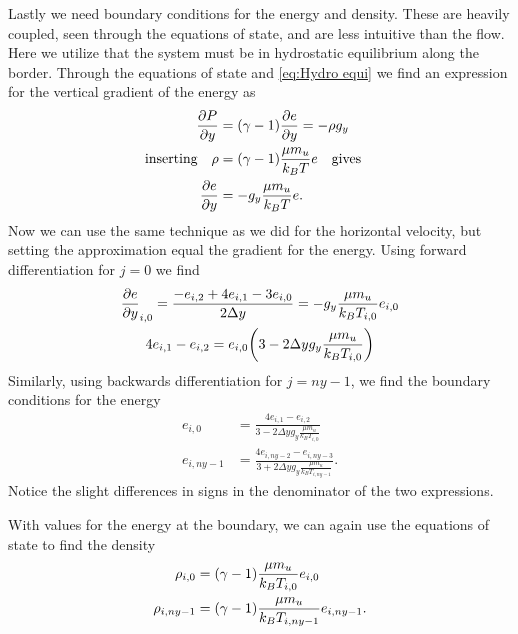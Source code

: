 \documentclass[11pt,a4paper,twocolumn,titlepage]{article}
\begin{document}
Lastly we need boundary conditions for the energy and density. These are heavily coupled, seen through the equations of state, and are less intuitive than the flow. Here we utilize that the system must be in hydrostatic equilibrium along the border. Through the equations of state and \cref{eq:Hydro equi} we find an expression for the vertical gradient of the energy as
\begin{align*}
\pdv{P}{y} &= (\gamma-1) \pdv{e}{y} = -\rho g_y
\\
\qq*{inserting} \rho &= (\gamma-1)\frac{\mu m_u }{k_BT}e \qq{gives}
\\
\pdv{e}{y} &= - g_y \frac{\mu m_u}{k_BT}e.
\end{align*}
Now we can use the same technique as we did for the horizontal velocity, but setting the approximation equal the gradient for the energy. Using forward differentiation for $j=0$ we find
\begin{gather*}
\pdv{e}{y}_{i,0} = \frac{-e_{i,2}+4e_{i,1}-3e_{i,0}}{2\Delta y} = - g_y \frac{\mu m_u}{k_BT_{i,0}}e_{i,0}
\\
4e_{i,1}-e_{i,2}= e_{i,0}\qty(3-2\Delta y g_y\frac{\mu m_u}{k_BT_{i,0}}) 
\end{gather*}
Similarly, using backwards differentiation for $j=ny-1$, we find the boundary conditions for the energy
\begin{equation}
\begin{aligned}
e_{i,0} &= \frac{4e_{i,1}-e_{i,2}}{3-2\Delta y g_y\frac{\mu m_u}{k_BT_{i,0}}}
\\
e_{i,ny-1} &= \frac{4e_{i,ny-2}-e_{i,ny-3}}{3 + 2\Delta y g_y \frac{\mu m_u}{k_B T_{i,ny-1}}}.
\end{aligned}
\label{eq:Boundary e}
\end{equation}
Notice the slight differences in signs in the denominator of the two expressions.

With values for the energy at the boundary, we can again use the equations of state to find the density
\begin{equation}
\begin{aligned}
\rho_{i,0} &= \qty(\gamma-1) \frac{\mu m_u}{k_BT_{i,0}}e_{i,0}
\\
\rho_{i,ny-1} &= \qty(\gamma-1) \frac{\mu m_u}{k_BT_{i,ny-1}}e_{i,ny-1}.
\end{aligned}
\label{eq:Boundary rho}
\end{equation}


\end{document}
